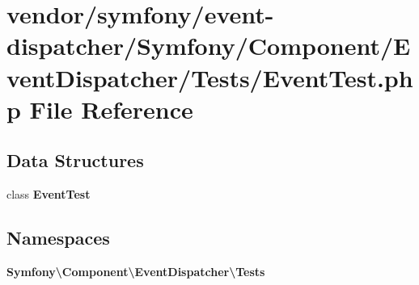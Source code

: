 \section{vendor/symfony/event-\/dispatcher/\+Symfony/\+Component/\+Event\+Dispatcher/\+Tests/\+Event\+Test.php File Reference}
\label{_event_test_8php}
\subsection*{Data Structures}
\begin{DoxyCompactItemize}
\item 
class {\bf Event\+Test}
\end{DoxyCompactItemize}
\subsection*{Namespaces}
\begin{DoxyCompactItemize}
\item 
 {\bf Symfony\textbackslash{}\+Component\textbackslash{}\+Event\+Dispatcher\textbackslash{}\+Tests}
\end{DoxyCompactItemize}
